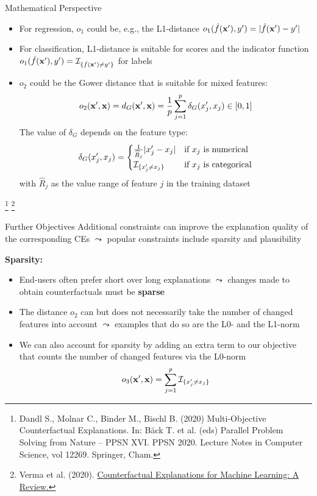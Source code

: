 \documentclass[11pt,compress,t,notes=noshow, aspectratio=169, xcolor=table]{beamer}
\begin{document}
\begin{frame}{Mathematical Perspective}
	
	\begin{itemize}
		\item For regression, $o_1$ could be, e.g., the L1-distance $o_1(\fh(\xv'), y') = |\fh(\xv')-y'|$\item For classification, L1-distance is suitable for scores and the indicator function $o_1(\fh(\xv'), y') = \Ind_{\{ \fh(\xv') \neq y' \}}$ for labels
		\item $o_2$ could be the Gower distance that is suitable for mixed features:
		$$o_2(\xv', \xv) = \Gower(\xv', \xv) = \frac{1}{p}\sum_{j = 1}^{p} \delta_G(x'_j, x_j)	\in [0, 1]$$
		The value of $\delta_G$ depends on the feature type:
		\begin{equation*}
		\delta_G(x'_j, x_j) =
		\begin{cases}
		\frac{1}{\widehat{R}_j}|x_j'- x_j| & \text{if $x_j$ is numerical} \\
		\Ind_{\{ x_j' \neq x_j \}} & \text{if $x_j$ is categorical}
		\end{cases}
		\end{equation*}
		with $\widehat{R}_j$ as the value range of feature $j$ in the training dataset
	\end{itemize}
\footnote[frame]{Dandl S., Molnar C., Binder M., Bischl B. (2020) Multi-Objective Counterfactual Explanations. In: Bäck T. et al. (eds) Parallel Problem Solving from Nature – PPSN XVI. PPSN 2020. Lecture Notes in Computer Science, vol 12269. Springer, Cham.}
\footnote[frame]{Verma et al. (2020). \href{https://arxiv.org/pdf/2010.10596.pdf}{Counterfactual Explanations for Machine Learning: A Review.}}
\end{frame}

\begin{frame}{Further Objectives}
	Additional constraints can improve the explanation quality of the corresponding CEs $\leadsto$ popular constraints include sparsity and plausibility\\\medskip

	\textbf{Sparsity:}
	\begin{itemize}
		\item End-users often prefer short over long explanations $\leadsto$ changes made to obtain counterfactuals must be \textbf{sparse}
		\item The distance $o_2$ can but does not necessarily take the number of changed features into account $\leadsto$ examples that do so are the L0- and the L1-norm
        \item We can also account for sparsity by adding an extra term to our objective that counts the number of changed features via the L0-norm $$o_3(\xv', \xv) = \sum_{j = 1}^p {\Ind}_{\{ x'_j \neq x_j \}}$$
	\end{itemize}
\end{frame}
\end{document}
